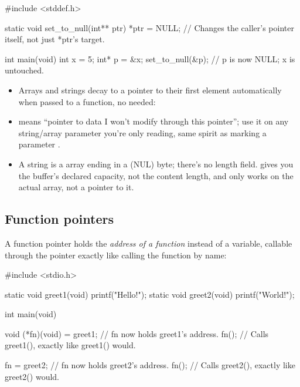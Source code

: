 \begin{ccode}
#include <stddef.h>

static void set_to_null(int** ptr)
{
    *ptr = NULL; // Changes the caller's pointer itself, not just *ptr's target.
}

int main(void)
{
    int x = 5;
    int* p = &x;
    set_to_null(&p);
    // p is now NULL; x is untouched.
}
\end{ccode}

\begin{itemize}
  \item Arrays and strings decay to a pointer to their first element automatically when passed to
    a function, no \code{&} needed:
\end{itemize}


\begin{itemize}
  \item {} means ``pointer to data I won't modify through this pointer''; use it on
    any string/array parameter you're only reading, same spirit as marking a parameter
    .
  \item A string is a  array ending in a  (NUL) byte; there's no length
    field.  gives you the buffer's declared capacity, not the content length, and only
    works on the actual array, not a pointer to it.
\end{itemize}

\subsection{Function pointers}
\label{c1:a:8}
A function pointer holds the \emph{address of a function} instead of a variable, callable through
the pointer exactly like calling the function by name:

\begin{ccode}
#include <stdio.h>

static void greet1(void) { printf("Hello!\n"); }
static void greet2(void) { printf("World!\n"); }

int main(void)
{
    void (*fn)(void) = greet1; // fn now holds greet1's address.
    fn();                      // Calls greet1(), exactly like greet1() would.

    fn = greet2;               // fn now holds greet2's address.
    fn();                      // Calls greet2(), exactly like greet2() would.
}
\end{ccode}

